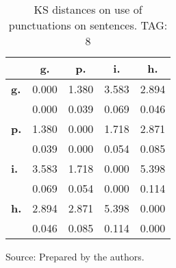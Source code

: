\begin{table}[h!]
\begin{center}
\caption{KS distances on use of punctuations on sentences. TAG: 8}
	\label{tab:kolPct}
\begin{tabular}{| l || c | c | c | c |}\hline
 & {\bf g.} & {\bf p.} & {\bf i.} & {\bf h.} \\\hline\hline
{\bf g.} & 0.000 & 1.380 & 3.583 & 2.894 \\
{\bf } & 0.000 & 0.039 & 0.069 & 0.046 \\\hline
{\bf p.} & 1.380 & 0.000 & 1.718 & 2.871 \\
{\bf } & 0.039 & 0.000 & 0.054 & 0.085 \\\hline
{\bf i.} & 3.583 & 1.718 & 0.000 & 5.398 \\
{\bf } & 0.069 & 0.054 & 0.000 & 0.114 \\\hline
{\bf h.} & 2.894 & 2.871 & 5.398 & 0.000 \\
{\bf } & 0.046 & 0.085 & 0.114 & 0.000 \\\hline
\end{tabular}
\begin{flushleft}
		Source: Prepared by the authors.\
\end{flushleft}
\end{center}
\end{table}

